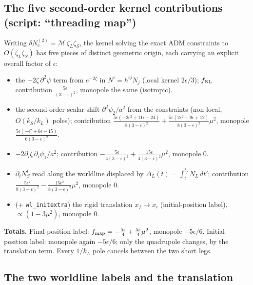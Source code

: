 \documentclass[aps,prd,twocolumn,superscriptaddress,showpacs,preprintnumbers,nofootinbib,longbibliography,floatfix]{revtex4-2}
\newcommand{\eps}{\epsilon}
\begin{document}
\subsection{The five second-order kernel contributions (script: ``threading map'')}

Writing $\delta N_c^{(2)}=\mathcal M\,\zeta_L\zeta_S$, the kernel solving the exact ADM
constraints to $O(\zeta_L\zeta_S)$ has five pieces of distinct geometric origin, each carrying
an explicit overall factor of $\eps$:

\begin{itemize}
\item[\texttt{zlap}] the $-2\zeta\,\partial^2\psi$ term from $e^{-2\zeta}$ in $N^i=h^{ij}N_j$
(local kernel $2\eps/3$); $f_{\rm NL}$ contribution $\tfrac{5\eps}{(3-\eps)^2}$, monopole
the same (isotropic).
\item[\texttt{psi2}] the second-order scalar shift $\partial^2\psi_2/a^2$ from the constraints
(non-local, $O(k_S/k_L)$ poles); contribution
$\tfrac{5\eps(-2\eps^2+11\eps-24)}{8(3-\eps)^2}+\tfrac{5\eps(2\eps^2-9\eps+12)}{8(3-\eps)^2}\mu^2$,
monopole $\tfrac{5\eps(-\eps^2+6\eps-15)}{6(3-\eps)^2}$.
\item[\texttt{grad}] $-2\partial_i\zeta\,\partial_i\psi_1/a^2$; contribution
$-\tfrac{5\eps}{4(3-\eps)^2}+\tfrac{15\eps}{4(3-\eps)^2}\mu^2$, monopole $0$.
\item[\texttt{wl\_fin}] $\partial_iN_S^i$ read along the worldline displaced by
$\Delta_L(t)=\int_t^{t_f}N_L\,dt'$; contribution
$\tfrac{5\eps^2}{8(3-\eps)^2}-\tfrac{15\eps^2}{8(3-\eps)^2}\mu^2$, monopole $0$.
\item[\texttt{lab\_init}] (+ \texttt{wl\_initextra}) the rigid translation $x_f\to x_i$
(initial-position label), $\propto(1-3\mu^2)$, monopole $0$.
\end{itemize}

\textbf{Totals.} Final-position label: $f_{\rm map}=-\tfrac{5\eps}{4}+\tfrac{5\eps}{4}\mu^2$,
monopole $-5\eps/6$. Initial-position label: monopole again $-5\eps/6$; only the quadrupole
changes, by the translation term. Every $1/k_L$ pole cancels between the two short legs.

\subsection{The two worldline labels and the translation}
\end{document}
